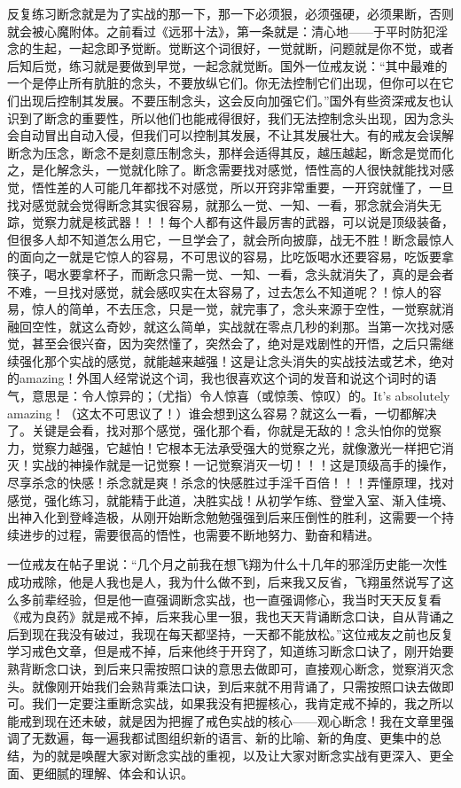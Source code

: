 反复练习断念就是为了实战的那一下，那一下必须狠，必须强硬，必须果断，否则就会被心魔附体。之前看过《远邪十法》，第一条就是：清心地——于平时防犯淫念的生起，一起念即予觉断。觉断这个词很好，一觉就断，问题就是你不觉，或者后知后觉，练习就是要做到早觉，一起念就觉断。国外一位戒友说：“其中最难的一个是停止所有肮脏的念头，不要放纵它们。你无法控制它们出现，但你可以在它们出现后控制其发展。不要压制念头，这会反向加强它们。”国外有些资深戒友也认识到了断念的重要性，所以他们也能戒得很好，我们无法控制念头出现，因为念头会自动冒出自动入侵，但我们可以控制其发展，不让其发展壮大。有的戒友会误解断念为压念，断念不是刻意压制念头，那样会适得其反，越压越起，断念是觉而化之，是化解念头，一觉就化除了。断念需要找对感觉，悟性高的人很快就能找对感觉，悟性差的人可能几年都找不对感觉，所以开窍非常重要，一开窍就懂了，一旦找对感觉就会觉得断念其实很容易，就那么一觉、一知、一看，邪念就会消失无踪，觉察力就是核武器！！！每个人都有这件最厉害的武器，可以说是顶级装备，但很多人却不知道怎么用它，一旦学会了，就会所向披靡，战无不胜！断念最惊人的面向之一就是它惊人的容易，不可思议的容易，比吃饭喝水还要容易，吃饭要拿筷子，喝水要拿杯子，而断念只需一觉、一知、一看，念头就消失了，真的是会者不难，一旦找对感觉，就会感叹实在太容易了，过去怎么不知道呢？！惊人的容易，惊人的简单，不去压念，只是一觉，就完事了，念头来源于空性，一觉察就消融回空性，就这么奇妙，就这么简单，实战就在零点几秒的刹那。当第一次找对感觉，甚至会很兴奋，因为突然懂了，突然会了，绝对是戏剧性的开悟，之后只需继续强化那个实战的感觉，就能越来越强！这是让念头消失的实战技法或艺术，绝对的amazing！外国人经常说这个词，我也很喜欢这个词的发音和说这个词时的语气，意思是：令人惊异的；（尤指）令人惊喜（或惊羡、惊叹）的。It's absolutely amazing！（这太不可思议了！）谁会想到这么容易？就这么一看，一切都解决了。关键是会看，找对那个感觉，强化那个看，你就是无敌的！念头怕你的觉察力，觉察力越强，它越怕！它根本无法承受强大的觉察之光，就像激光一样把它消灭！实战的神操作就是一记觉察！一记觉察消灭一切！！！这是顶级高手的操作，尽享杀念的快感！杀念就是爽！杀念的快感胜过手淫千百倍！！！弄懂原理，找对感觉，强化练习，就能精于此道，决胜实战！从初学乍练、登堂入室、渐入佳境、出神入化到登峰造极，从刚开始断念勉勉强强到后来压倒性的胜利，这需要一个持续进步的过程，需要很高的悟性，也需要不断地努力、勤奋和精进。

一位戒友在帖子里说：“几个月之前我在想飞翔为什么十几年的邪淫历史能一次性成功戒除，他是人我也是人，我为什么做不到，后来我又反省，飞翔虽然说写了这么多前辈经验，但是他一直强调断念实战，也一直强调修心，我当时天天反复看《戒为良药》就是戒不掉，后来我心里一狠，我也天天背诵断念口诀，自从背诵之后到现在我没有破过，我现在每天都坚持，一天都不能放松。”这位戒友之前也反复学习戒色文章，但是戒不掉，后来他终于开窍了，知道练习断念口诀了，刚开始要熟背断念口诀，到后来只需按照口诀的意思去做即可，直接观心断念，觉察消灭念头。就像刚开始我们会熟背乘法口诀，到后来就不用背诵了，只需按照口诀去做即可。我们一定要注重断念实战，如果我没有把握核心，我肯定戒不掉的，我之所以能戒到现在还未破，就是因为把握了戒色实战的核心——观心断念！我在文章里强调了无数遍，每一遍我都试图组织新的语言、新的比喻、新的角度、更集中的总结，为的就是唤醒大家对断念实战的重视，以及让大家对断念实战有更深入、更全面、更细腻的理解、体会和认识。

